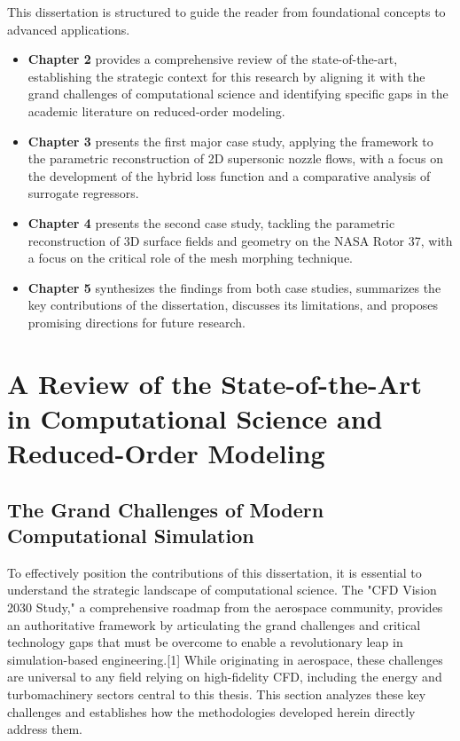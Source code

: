 \documentclass[12pt, a4paper]{report}
\begin{document}
This dissertation is structured to guide the reader from foundational concepts to advanced applications.
\begin{itemize}
    \item \textbf{Chapter 2} provides a comprehensive review of the state-of-the-art, establishing the strategic context for this research by aligning it with the grand challenges of computational science and identifying specific gaps in the academic literature on reduced-order modeling.
    \item \textbf{Chapter 3} presents the first major case study, applying the framework to the parametric reconstruction of 2D supersonic nozzle flows, with a focus on the development of the hybrid loss function and a comparative analysis of surrogate regressors.
    \item \textbf{Chapter 4} presents the second case study, tackling the parametric reconstruction of 3D surface fields and geometry on the NASA Rotor 37, with a focus on the critical role of the mesh morphing technique.
    \item \textbf{Chapter 5} synthesizes the findings from both case studies, summarizes the key contributions of the dissertation, discusses its limitations, and proposes promising directions for future research.
\end{itemize}

\chapter{A Review of the State-of-the-Art in Computational Science and Reduced-Order Modeling}

\section{The Grand Challenges of Modern Computational Simulation}

To effectively position the contributions of this dissertation, it is essential to understand the strategic landscape of computational science. The "CFD Vision 2030 Study," a comprehensive roadmap from the aerospace community, provides an authoritative framework by articulating the grand challenges and critical technology gaps that must be overcome to enable a revolutionary leap in simulation-based engineering.[1] While originating in aerospace, these challenges are universal to any field relying on high-fidelity CFD, including the energy and turbomachinery sectors central to this thesis. This section analyzes these key challenges and establishes how the methodologies developed herein directly address them.
\end{document}
